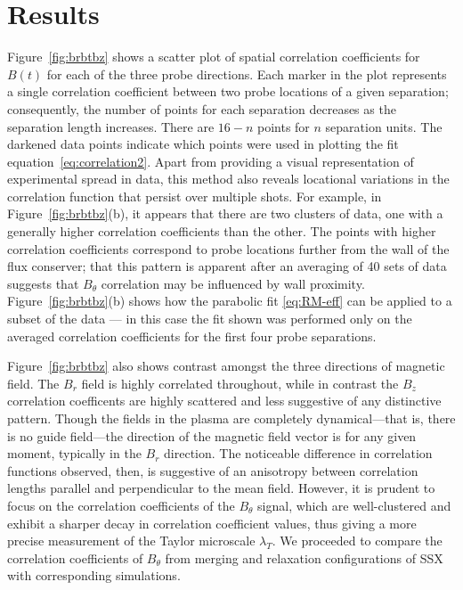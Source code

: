 \documentclass[aip,prl,amsmath,amssymb,reprint,superscriptaddress]{revtex4-1} %
\begin{document}
\section{Results}

Figure~\ref{fig:brbtbz} shows a scatter plot of spatial correlation coefficients for $B(t)$ for each of the three probe directions. Each marker in the plot represents a single correlation coefficient between two probe locations of a given separation; consequently, the number of points for each separation decreases as the separation length increases. There are $16-n$ points for $n$ separation units. The darkened data points indicate which points were used in plotting the fit equation~\eqref{eq:correlation2}. Apart from providing a visual representation of experimental spread in data, this method also reveals locational variations in the correlation function that persist over multiple shots. For example, in Figure~\ref{fig:brbtbz}(b), it appears that there are two clusters of data, one with a generally higher correlation coefficients than the other. The points with higher correlation coefficients correspond to probe locations further from the wall of the flux conserver; that this pattern is apparent after an averaging of 40 sets of data suggests that $B_\theta$ correlation may be influenced by wall proximity. Figure~\ref{fig:brbtbz}(b) shows how the parabolic fit \eqref{eq:RM-eff} can be applied to a subset of the data --- in this case the fit shown was performed only on the averaged correlation coefficients for the first four probe separations.

Figure~\ref{fig:brbtbz} also shows contrast amongst the three directions of magnetic field. The $B_r$ field is highly correlated throughout, while in contrast the $B_z$ correlation coefficents are highly scattered and less suggestive of any distinctive pattern. Though the fields in the plasma are completely dynamical---that is, there is no guide field---the direction of the magnetic field vector is for any given moment, typically in the $B_{r}$ direction. The noticeable difference in correlation functions observed, then, is suggestive of an anisotropy between correlation lengths parallel and perpendicular to the mean field. However, it is prudent to focus on the correlation coefficients of the $B_\theta$ signal, which are well-clustered and exhibit a sharper decay in correlation coefficient values, thus giving a more precise measurement of the Taylor microscale $\lambda_T$. We proceeded to compare the correlation coefficients of $B_\theta$ from merging and relaxation configurations of SSX with corresponding simulations. 
\end{document}

